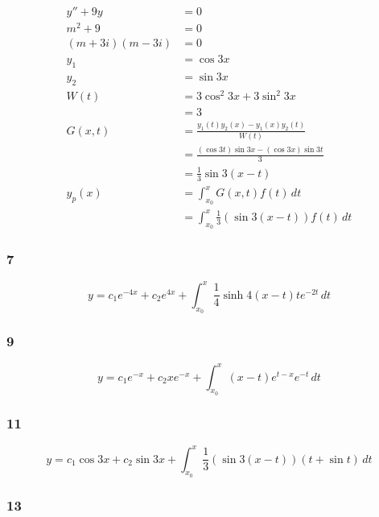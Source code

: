 \documentclass{article}
\begin{document}
\begin{align*}
  y'' + 9y          & = 0                                                   \\
  m^2 + 9           & = 0                                                   \\
  (m + 3i) (m - 3i) & = 0                                                   \\
  y_1               & = \cos 3x                                             \\
  y_2               & = \sin 3x                                             \\
  W(t)              & = 3 \cos^2 3x + 3 \sin^2 3x                           \\
                    & = 3                                                   \\
  G(x, t)           & = \frac{y_1(t) y_2(x) - y_1(x) y_2(t)}{W(t)}          \\
                    & = \frac{(\cos 3t) \sin 3x - (\cos 3x) \sin 3t}{3}     \\
                    & = \frac{1}{3} \sin 3 (x - t)                          \\
  y_p(x)            & = \int_{x_0}^x G(x, t) f(t) \,dt                      \\
                    & = \int_{x_0}^x \frac{1}{3} (\sin 3 (x - t)) f(t) \,dt
\end{align*}

\subsubsection{7}

\[y = c_1 e^{-4x} + c_2 e^{4x} + \int_{x_0}^x \frac{1}{4} \sinh 4 (x - t) t e^{-2t} \,dt\]

\subsubsection{9}

\[y = c_1 e^{-x} + c_2 x e^{-x} + \int_{x_0}^x (x - t) e^{t - x} e^{-t} \,dt\]

\subsubsection{11}

\[y = c_1 \cos 3x + c_2 \sin 3x + \int_{x_0}^x \frac{1}{3} (\sin 3 (x - t)) (t + \sin t) \,dt\]

\subsubsection{13}
\end{document}
